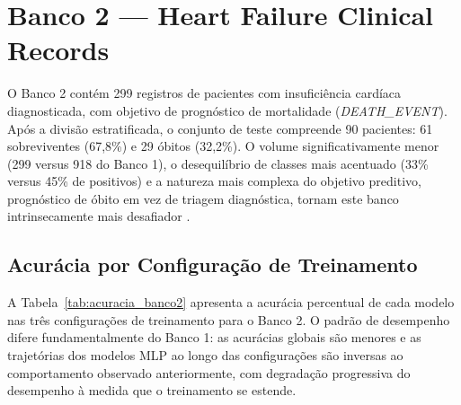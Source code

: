 \section{Banco 2 --- Heart Failure Clinical Records}
\label{sec:resultados_banco2}

O Banco 2 contém 299 registros de pacientes com insuficiência cardíaca diagnosticada, com objetivo de prognóstico de mortalidade (\textit{DEATH\_EVENT}). Após a divisão estratificada, o conjunto de teste compreende 90 pacientes: 61 sobreviventes (67,8\%) e 29 óbitos (32,2\%). O volume significativamente menor (299 versus 918 do Banco 1), o desequilíbrio de classes mais acentuado (33\% versus 45\% de positivos) e a natureza mais complexa do objetivo preditivo, prognóstico de óbito em vez de triagem diagnóstica, tornam este banco intrinsecamente mais desafiador \cite{chicco2020}.

\subsection{Acurácia por Configuração de Treinamento}
\label{sec:banco2_acuracia}

A Tabela~\ref{tab:acuracia_banco2} apresenta a acurácia percentual de cada modelo nas três configurações de treinamento para o Banco 2. O padrão de desempenho difere fundamentalmente do Banco 1: as acurácias globais são menores e as trajetórias dos modelos MLP ao longo das configurações são inversas ao comportamento observado anteriormente, com degradação progressiva do desempenho à medida que o treinamento se estende.

\begin{table}[H]
\centering
\caption{Acurácia (\%) dos modelos no Banco 2 por configuração de treinamento.}
\label{tab:acuracia_banco2}
\end{table}


